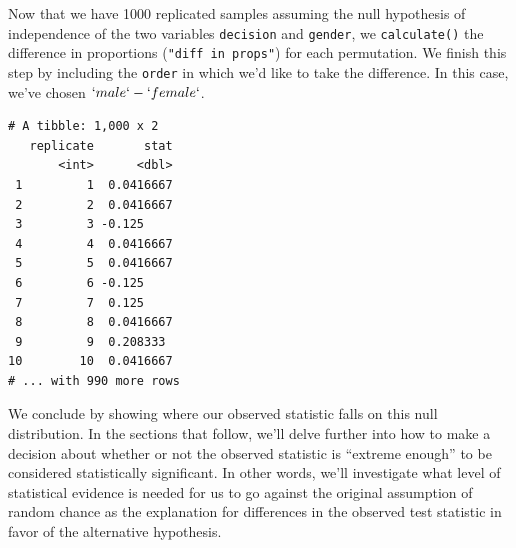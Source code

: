 \documentclass[12pt, krantz2,]{krantz}
\makeatletter
\newenvironment{Shaded}{\begin{snugshade}}{\end{snugshade}}
\newcommand{\DataTypeTok}[1]{\textcolor[rgb]{0.27,0.27,0.27}{#1}}
\newcommand{\DecValTok}[1]{\textcolor[rgb]{0.06,0.06,0.06}{#1}}
\newcommand{\KeywordTok}[1]{\textcolor[rgb]{0.27,0.27,0.27}{\textbf{#1}}}
\newcommand{\NormalTok}[1]{#1}
\newcommand{\OperatorTok}[1]{\textcolor[rgb]{0.43,0.43,0.43}{\textbf{#1}}}
\newcommand{\StringTok}[1]{\textcolor[rgb]{0.5,0.5,0.5}{#1}}
\newenvironment{kframe}{%
\medskip{}
\setlength{\fboxsep}{.8em}
 \def\at@end@of@kframe{}%
 \ifinner\ifhmode%
  \def\at@end@of@kframe{\end{minipage}}%
  \begin{minipage}{\columnwidth}%
 \fi\fi%
 \def\FrameCommand##1{\hskip\@totalleftmargin \hskip-\fboxsep
 \colorbox{shadecolor}{##1}\hskip-\fboxsep
     \hskip-\linewidth \hskip-\@totalleftmargin \hskip\columnwidth}%
 \MakeFramed {\advance\hsize-\width
   \@totalleftmargin\z@ \linewidth\hsize
   \@setminipage}}%
 {\par\unskip\endMakeFramed%
 \at@end@of@kframe}
\renewenvironment{Shaded}{\begin{kframe}}{\end{kframe}}
\makeatother
\begin{document}
Now that we have 1000 replicated samples assuming the null hypothesis of independence of the two variables \texttt{decision} and \texttt{gender}, we \texttt{calculate()} the difference in proportions (\texttt{"diff\ in\ props"}) for each permutation. We finish this step by including the \texttt{order} in which we'd like to take the difference. In this case, we've chosen \(`male` - `female`\).

\begin{Shaded}
\end{Shaded}

\begin{verbatim}
# A tibble: 1,000 x 2
   replicate       stat
       <int>      <dbl>
 1         1  0.0416667
 2         2  0.0416667
 3         3 -0.125    
 4         4  0.0416667
 5         5  0.0416667
 6         6 -0.125    
 7         7  0.125    
 8         8  0.0416667
 9         9  0.208333 
10        10  0.0416667
# ... with 990 more rows
\end{verbatim}

We conclude by showing where our observed statistic falls on this null distribution. In the sections that follow, we'll delve further into how to make a decision about whether or not the observed statistic is ``extreme enough'' to be considered statistically significant. In other words, we'll investigate what level of statistical evidence is needed for us to go against the original assumption of random chance as the explanation for differences in the observed test statistic in favor of the alternative hypothesis.
\end{document}
